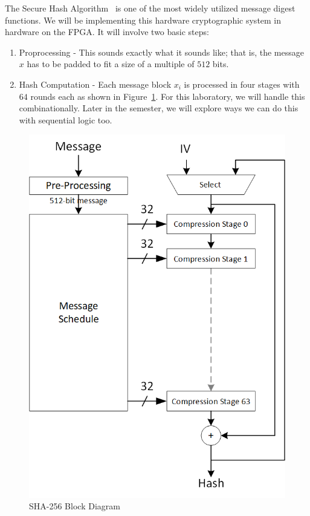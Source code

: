 \documentclass{article}
\begin{document}
The Secure Hash Algorithm~\cite{1250396} is one of the most widely
utilized message digest functions.  We will be implementing this
hardware cryptographic system in hardware on the FPGA.  It will
involve two basic steps:
\begin{enumerate}
  \item Proprocessing - This sounds exactly what it sounds like; that
    is, the message $x$ has to be padded to fit a size of a multiple
    of $512$ bits.
    \item Hash Computation - Each message block $x_i$ is processed in
      four stages with $64$ rounds each as shown in
      Figure~\ref{sha2.fig}.  For this laboratory, we will handle this
      combinationally.  Later in the semester, we will explore ways we
      can do this with sequential logic too.
\end{enumerate}
\begin{figure} [t!]
  \centering
  \includegraphics[scale=0.8]{sha256.png}
  \caption{SHA-256 Block Diagram}
  \label{sha2.fig}
\end{figure}
\end{document}
